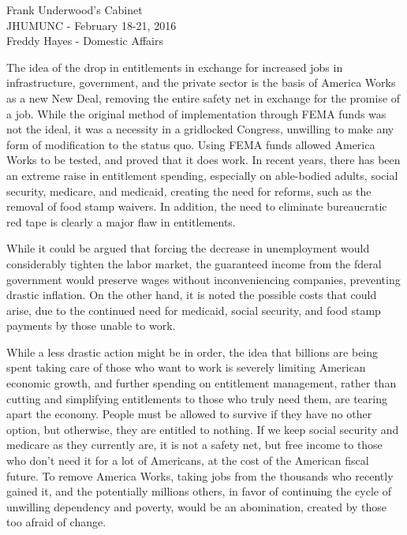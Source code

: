 \documentclass[12pt]{article}
\begin{document}
\begin{flushleft}
Frank Underwood's Cabinet \\
JHUMUNC - February 18-21, 2016 \\
Freddy Hayes - Domestic Affairs
\end{flushleft}


The idea of the drop in entitlements in exchange for increased jobs in infrastructure, government, and the private sector is the basis of America Works as a new New Deal, removing the entire safety net in exchange for the promise of a job. While the original method of implementation through FEMA funds was not the ideal, it was a necessity in a gridlocked Congress, unwilling to make any form of modification to the status quo. Using FEMA funds allowed America Works to be tested, and proved that it does work. In recent years, there has been an extreme raise in entitlement spending, especially on able-bodied adults, social security, medicare, and medicaid, creating the need for reforms, such as the removal of food stamp waivers. In addition, the need to eliminate bureaucratic red tape is clearly a major flaw in entitlements.

While it could be argued that forcing the decrease in unemployment would considerably tighten the labor market, the guaranteed income from the fderal government would preserve wages without inconveniencing companies, preventing drastic inflation. On the other hand, it is noted the possible costs that could arise, due to the continued need for medicaid, social security, and food stamp payments by those unable to work.

While a less drastic action might be in order, the idea that billions are being spent taking care of those who want to work is severely limiting American economic growth, and further spending on entitlement management, rather than cutting and simplifying entitlements to those who truly need them, are tearing apart the economy. People must be allowed to survive if they have no other option, but otherwise, they are entitled to nothing. If we keep social security and medicare as they currently are, it is not a safety net, but free income to those who don't need it for a lot of Americans, at the cost of the American fiscal future. To remove America Works, taking jobs from the thousands who recently gained it, and the potentially millions others, in favor of continuing the cycle of unwilling dependency and poverty, would be an abomination, created by those too afraid of change.
\end{document}
